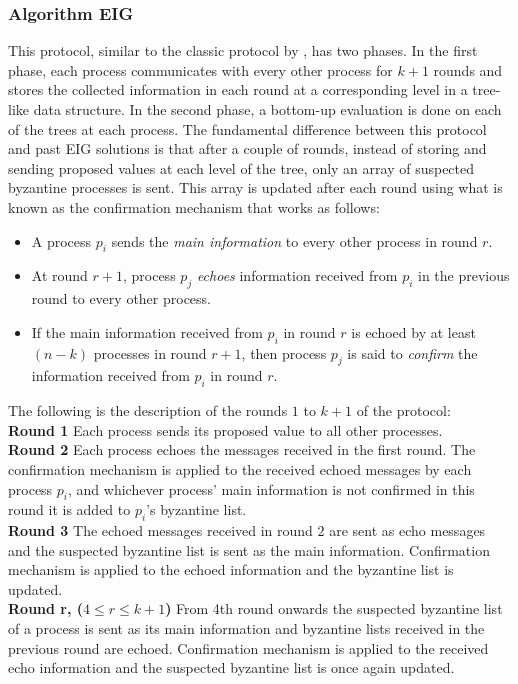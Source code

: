 \subsubsection{Algorithm EIG \cite{KM13}}
This protocol, similar to the classic protocol by \cite{Bar-NoyD91}, has two phases. In the first phase, each process communicates with every other process for $k + 1$ rounds and stores the collected information in each round at a corresponding level in a tree-like data structure. In the second phase, a bottom-up evaluation is done on each of the trees at each process. The fundamental difference between this protocol and past EIG solutions is that after a couple of rounds, instead of storing and sending proposed values at each level of the tree, only an array of suspected byzantine processes is sent. This array is updated after each round using what is known as the confirmation mechanism that works as follows:
\begin{itemize}
\item A process $p_i$ sends the \textit{main information} to every other process in round $r$.
\item At round $r+1$, process $p_j$ \textit{echoes} information received from $p_i$ in the previous round to every other process. 
\item If the main information received from $p_i$ in round $r$ is echoed by at least $(n - k)$ processes in round $r+1$, then process $p_j$ is said to \textit{confirm} the information received from $p_i$ in round $r$.
    \end{itemize}
    The following is the description of the rounds $1$ to $k+1$ of the protocol: \\
    \textbf{Round 1} Each process sends its proposed value to all other processes. \\
    \textbf{Round 2} Each process echoes the messages received in the first round.
    The confirmation mechanism is applied to the received echoed messages by each process $p_i$, and whichever process' main information is not confirmed in this round it is added to $p_i$'s byzantine list. \\
    \textbf{Round 3} The echoed messages received in round $2$ are sent as echo messages and the suspected byzantine list is sent as the main information. Confirmation mechanism is applied to the echoed information and the byzantine list is updated. \\
    \textbf{Round r, ($4 \leq r \leq k+1$)} From 4th round onwards the suspected byzantine list of a process is sent as its main information and byzantine lists received in the previous round are echoed. Confirmation mechanism is applied to the received echo information and the suspected byzantine list is once again updated.

